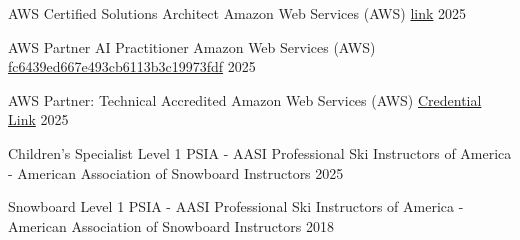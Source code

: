 

\begin{cvhonors}

  \cvhonor
    {AWS Certified Solutions Architect} %
    {Amazon Web Services (AWS)} %
    {\href{https://cp.certmetrics.com/amazon/en/public/verify/credential}{link}} %
    {2025} %

  \cvhonor
    {AWS Partner AI Practitioner} %
    {Amazon Web Services (AWS)} %
    {\href{https://cp.certmetrics.com/amazon/en/public/verify/credential}{fc6439ed667e493cb6113b3c19973fdf}} %
    {2025} %

  \cvhonor
    {AWS Partner: Technical Accredited} %
    {Amazon Web Services (AWS)} %
    {\href{https://www.credly.com/badges/09b8158c-ed6d-4068-a305-7c369b1739c0/linked_in_profile}{Credential Link}} %
    {2025} %

  \cvhonor
    {Children's Specialist Level 1} %
    {PSIA - AASI Professional Ski Instructors of America - American Association of Snowboard Instructors} %
    {} %
    {2025} %

  \cvhonor
    {Snowboard Level 1} %
    {PSIA - AASI Professional Ski Instructors of America - American Association of Snowboard Instructors} %
    {} %
    {2018} %
\end{cvhonors}
